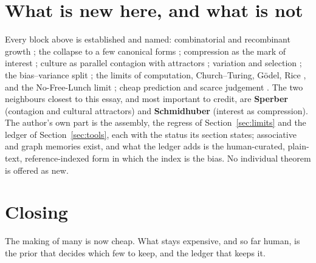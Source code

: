 \documentclass[11pt]{article}
\begin{document}
\section{What is new here, and what is not}
\label{sec:new}
Every block above is established and named: combinatorial and recombinant
growth \cite{weitzman1998}; the collapse to a few canonical forms
\cite{thom1975, arnold1984, wolfram2002, conwaymorris2003, thompson1917}; compression as the mark of interest
\cite{schmidhuber2010}; culture as parallel contagion with attractors \cite{sperber1996, rogers2003};
variation and selection \cite{campbell1960, boyd1985}; the bias--variance split \cite{geman1992}; the
limits of computation, Church--Turing, G\"odel, Rice \cite{davis_sigal_weyuker}, and the No-Free-Lunch
limit \cite{wolpert1996}; cheap prediction and scarce judgement \cite{agrawal2018}. The
two neighbours closest to this essay, and most important to credit, are \textbf{Sperber} (contagion
and cultural attractors) and \textbf{Schmidhuber} (interest as compression). The author's own part is
the assembly, the regress of Section~\ref{sec:limits} and the ledger of Section~\ref{sec:tools},
each with the status its section states; associative and graph memories exist, and what the ledger
adds is the human-curated, plain-text, reference-indexed form in which the index is the bias. No
individual theorem is offered as new.

\section*{Closing}
The making of many is now cheap. What stays expensive, and so far human, is the prior that decides
which few to keep, and the ledger that keeps it.

\printbibliography
\end{document}
